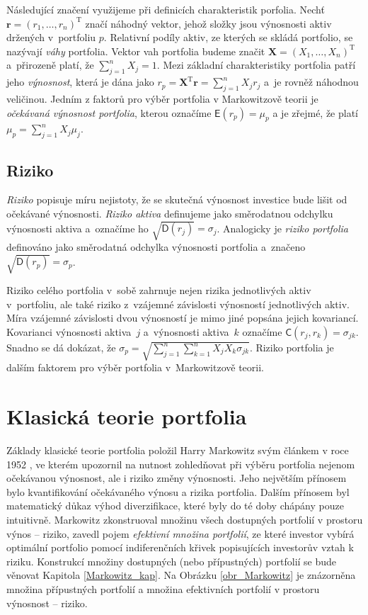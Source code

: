 \documentclass[a4paper,12pt]{report}
\theoremstyle{definition} \newtheorem{definice}[veta]{Definice}
\theoremstyle{remark}
\begin{document}
Následující značení využijeme při definicích charakteristik porfolia.
Nechť $\boldsymbol{r}=(r_1,\dots,r_n)^\mathrm{T}$ značí náhodný vektor, jehož složky jsou výnosnosti aktiv držených v~portfoliu $p$.
Relativní podíly aktiv, ze kterých se skládá portfolio, se nazývají \textit{váhy} portfolia.
Vektor vah portfolia budeme značit $\boldsymbol{X}=(X_1,\dots,X_n)^\mathrm{T}$ a~přirozeně platí, že $\sum_{j=1}^nX_j=1$. 
Mezi základní charakteristiky portfolia patří jeho \textit{výnosnost}, která je dána jako $r_p=\boldsymbol{X}^\mathrm{T}\boldsymbol{r}=\sum_{j=1}^nX_jr_j$ a~je rovněž náhodnou veličinou.   
Jedním z faktorů pro výběr portfolia v Markowitzově teorii je \textit{očekávaná výnosnost portfolia}, kterou označíme $\mathsf{E}(r_p)=\mu_p$ a je zřejmé, že platí $\mu_p=\sum_{j=1}^nX_j\mu_j$.

\subsection{Riziko}
\textit{Riziko} popisuje míru nejistoty, že se skutečná výnosnost investice bude lišit od očekávané výnosnosti.  
\textit{Riziko aktiva} definujeme jako směrodatnou odchylku výnosnosti aktiva a~označíme ho $\sqrt{\mathsf{D}(r_j)}=\sigma_j$.
Analogicky je \textit{riziko portfolia} definováno jako směrodatná odchylka výnosnosti portfolia a~značeno $\sqrt{\mathsf{D}(r_p)}=\sigma_p$.  

Riziko celého portfolia v~sobě zahrnuje nejen rizika jednotlivých aktiv v~portfoliu, ale také riziko z~vzájemné závislosti výnosností jednotlivých aktiv.
Míra vzájemné závislosti dvou výnosností je mimo jiné popsána jejich kovariancí. 
Kovarianci výnosnosti aktiva~$j$ a~výnosnosti aktiva~$k$ označíme $\mathsf{C}(r_j,r_k)=\sigma_{jk}$.
Snadno se dá dokázat, že $\sigma_p=\sqrt{\sum_{j=1}^n\sum_{k=1}^nX_jX_k\sigma_{jk}}$.
Riziko portfolia je dalším faktorem pro výběr portfolia v~Markowitzově teorii.  




\section{Klasická teorie portfolia}\label{KTP}

Základy klasické teorie portfolia položil Harry Markowitz svým článkem v roce 1952 \cite{markowitz}, ve kterém upozornil na nutnost zohledňovat při výběru portfolia nejenom očekávanou výnosnost, ale i riziko změny výnosnosti.
Jeho největším přínosem bylo kvantifikování očekávaného výnosu a rizika portfolia. 
Dalším přínosem byl matematický důkaz výhod diverzifikace, které byly do té doby chápány pouze intuitivně.
Markowitz zkonstruoval množinu všech dostupných portfolií v prostoru výnos -- riziko, zavedl pojem \textit{efektivní množina portfolií}, ze které investor vybírá optimální portfolio pomocí indiferenčních křivek popisujících investorův vztah k riziku.
Konstrukcí množiny dostupných (nebo přípustných) portfolií se bude věnovat Kapitola \ref{Markowitz_kap}. 
Na Obrázku \ref{obr_Markowitz} je znázorněna množina přípustných portfolií  a množina efektivních portfolií v prostoru výnosnost -- riziko. 
\end{document}
